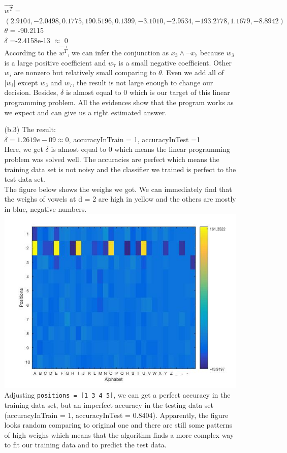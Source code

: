 \begin{enumerate}
\begin{itemize}
	    $\vec{w^T}$ = $(2.9104,-2.0498,0.1775,190.5196,0.1399,-3.1010,-2.9534,-193.2778,1.1679,-8.8942)$ \\ 
	    $\theta$ = -90.2115 \\ 
	    $\delta$ =-2.4158e-13 $\approx$ 0\\ 
   According to the $\vec{w^T}$, we can infer the conjunction as $x_3 \land \lnot x_7$ because $w_3$ is a large positive coefficient and  $w_7$ is a small negative coefficient. Other $w_i$ are nonzero but relatively small comparing to $\theta$. Even we add all of $|w_i|$ except $w_3$ and $w_7$, the result is not large enough to change our decision. Besides, $\delta$ is almost equal to 0 which is our target of this linear programming problem. All the evidences show that the program works as we expect and can give us a right estimated answer.
\clearpage
\item [(b.3)]
	The result:\\
	$\delta = 1.2619e-09 \approx 0$, accuracyInTrain = 1, accuracyInTest =1\\
	Here, we get $\delta$ is almost equal to 0 which means the linear programming problem was solved well. The accuracies are perfect which means the training data set is not noisy and the classifier we trained is perfect to the test data set.\\
	The figure below shows the weighs we got. We can immediately find that the weighs of vowels at d = 2 are high in yellow and the others are mostly in blue, negative numbers.\\
	\includegraphics[scale= 0.8]{fig2.jpg}\\ 
	Adjusting {\tt positions = [1 3 4 5]}, we can get a perfect accuracy in the training data set, but an imperfect accuracy in the testing data set (accuracyInTrain = 1, accuracyInTest = 0.8404). Apparently, the figure looks random comparing to original one and there are still some patterns of high weighs which means that the algorithm finds a more complex way to fit our training data and to predict the test data. \\

\end{itemize}
\end{enumerate}
